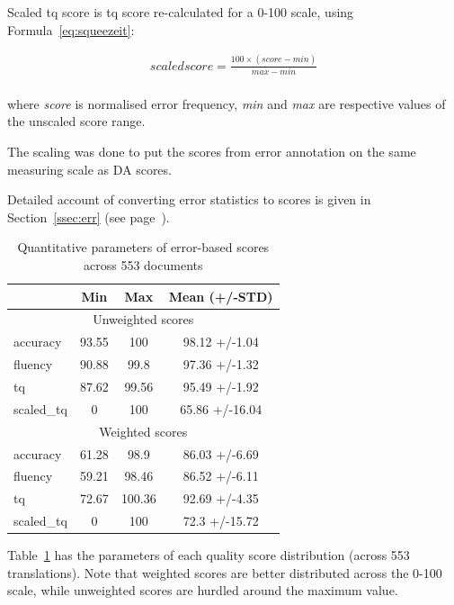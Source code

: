 Scaled tq score is tq score re-calculated for a 0-100 scale, using Formula~\ref{eq:squeezeit}:

\begin{equation}\label{eq:squeezeit}
\begin{split}
scaled score = \frac{100\times (score - min)}{max - min} \\
\end{split}
\end{equation}

where \textit{score} is normalised error frequency, \textit{min} and \textit{max} are respective values of the unscaled score range.

The scaling was done to put the scores from error annotation on the same measuring scale as DA scores. 

Detailed account of converting error statistics to scores is given in Section~\ref{ssec:err} (see page~\pageref{pg:err-score-generation}). 

\begin{table}[H]
	\centering
	\begin{tabular}{l|ccc}
		\toprule
		& Min   & Max    & Mean (+/-STD)  \\
		\midrule
		\multicolumn{4}{c}{Unweighted scores} \\
		\midrule
		accuracy   & 93.55 & 100    & 98.12 +/-1.04  \\
		fluency    & 90.88 & 99.8   & 97.36 +/-1.32  \\
		tq         & 87.62 & 99.56  & 95.49 +/-1.92  \\
		scaled\_tq & 0     & 100    & 65.86 +/-16.04 \\
		\midrule
		\multicolumn{4}{c}{Weighted scores} \\
		\midrule
		accuracy   & 61.28 & 98.9   & 86.03 +/-6.69  \\
		fluency    & 59.21 & 98.46  & 86.52 +/-6.11  \\
		tq         & 72.67 & 100.36 & 92.69 +/-4.35  \\
		scaled\_tq & 0     & 100    & 72.3  +/-15.72 \\
		\bottomrule
	\end{tabular}
	\caption{\label{tab:docs_err_par}Quantitative parameters of error-based scores across 553 documents}
\end{table}

Table~\ref{tab:docs_err_par} has the parameters of each quality score distribution (across 553 translations). Note that weighted scores are better distributed across the 0-100 scale, while unweighted scores are hurdled around the maximum value.

